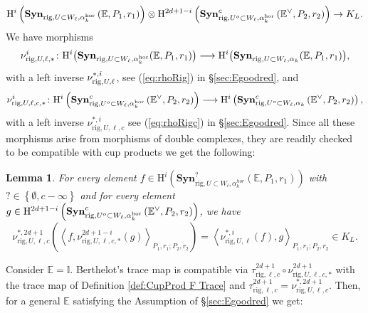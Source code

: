 \documentclass[asterisque,english]{smfart}
\newtheorem{lemma}[theo]{Lemma}
\begin{document}
\begin{equation}\label{CupProd F Def2Rig}
\mathrm{H}^{i}\left(
\mathbf{Syn}_{{\rm rig},U\subset W_\ell,\alpha_k^{\rm hor}}\left(\mathbb{E},P_1,r_1\right)
\right) \otimes \mathrm{H}^{2d+1-i}\left(
\mathbf{Syn}^c_{{\rm rig},U^o\subset W_\ell,\alpha_k^{\rm hor}}\left(\mathbb{E}^{\vee},P_2,r_2
\right)\right) \rightarrow K_{L} . 
\end{equation}
We have morphisms 
$$
\nu_{{\rm rig},U,\ell,\ast}^i\colon \mathrm{H}^i\bigl(\mathbf{Syn}_{{\rm rig},U\subset W_\ell, \alpha_k^{\rm hor}}(\mathbb{E},P_1,r_1)\bigr) \longrightarrow \mathrm{H}^i\bigl(\mathbf{Syn}_{{\rm rig},U\subset W_\ell, \alpha_k}(\mathbb{E},P_1,r_1)\bigr),
$$with a left inverse $\nu_{{\rm rig},U,\ell}^{\ast,i}$, see  (\ref{eq:rhoRig}) in \S \ref{sec:Egoodred},
and
$$\nu_{\mathrm{rig},U,\ell,c,\ast}^i\colon \mathrm{H}^{i}\left( \mathbf{Syn}_{\mathrm{rig}
,U^{o}\subset W_\ell, \alpha_k^{\rm hor}}^{c}\left( \mathbb{E}^\vee,P_2,r_2\right)
\right) \longrightarrow \mathrm{H}^{i}\left( \mathbf{Syn}_{\mathrm{rig}
,U^{o}\subset W_\ell, \alpha_k}^{c}\left( \mathbb{E}^\vee,P_2,r_2\right)
\right),$$with a left inverse $\nu_{\mathrm{rig},U,\ell,c}^{\ast,i}$ see (\ref{eq:rhoRigc}) in \S \ref{sec:Egoodred}. Since all these morphisms arise from morphisms of double complexes, they are readily checked to be compatible with cup products we get the following:

\begin{lemma}\label{lemma:pairnu} For every element $f\in \mathrm{H}^{i}\left( \mathbf{Syn}_{\mathrm{rig},U\subset
W_{l},\alpha _{k}^{hor}}^{?}\left( \mathbb{E},P_{1},r_{1}\right) \right) $
with $?\in \left\{ \emptyset ,c-\infty \right\} $ and for every element $g\in \mathrm{H}^{2d+1-i}\left( \mathbf{Syn}_{\mathrm{rig}
,U^{o}\subset W_\ell, \alpha_k^{\rm hor}}^{c}\left( \mathbb{E}^\vee,P_2,r_2\right)
\right)$, we have 
$$
\nu _{\mathrm{rig},U, \ell,c}^{\ast,2d+1}  \left( \left\langle  f  ,\nu _{\mathrm{rig},U, \ell,c,\ast}^{2d+1-i}(g)\right\rangle
_{P_{1},r_{1};P_{2},r_{2}}\right)=\left\langle \nu _{\mathrm{rig},U,\ell}^{\ast,i}( f), g \right\rangle _{P_{1},r_{1};P_{2},r_{2}}\in  K_L.
$$
\end{lemma}
Consider $\mathbb{E}=\mathbb{I}$. Berthelot's trace map is compatible via $\tau_{\mathrm{rig},\ell,c}^{2d+1} \circ \nu_{\mathrm{rig},U,\ell,c,\ast}^{2d+1}$ with the trace map of Definition \ref{def:CupProd F Trace} and $\tau_{\mathrm{rig},\ell,c}^{2d+1}=\nu _{\mathrm{rig},U, \ell,c}^{\ast,2d+1}$. Then, for a general $\mathbb{E}$ satisfying the Assumption of \S \ref{sec:Egoodred} we get:  
\end{document}
